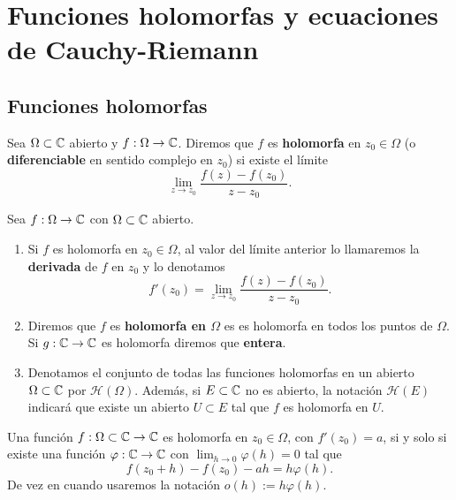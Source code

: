 \chapter{Funciones holomorfas y ecuaciones de Cauchy-Riemann}
\section{Funciones holomorfas}
\begin{definition}
Sea $\displaystyle \Omega \subset \mathbb{C} $ abierto y $\displaystyle f : \Omega \to \mathbb{C} $. Diremos que $\displaystyle f $ es \textbf{holomorfa} en $\displaystyle z_{0} \in \Omega  $ (o \textbf{diferenciable} en sentido complejo en $\displaystyle z_{0} $) si existe el límite
\[\lim_{z \to z_{0}}\frac{f\left(z\right)-f\left(z_{0}\right)}{z-z_{0}} .\]
\end{definition}
\begin{notation}
Sea $\displaystyle f : \Omega \to \mathbb{C} $ con $\displaystyle \Omega \subset \mathbb{C} $ abierto. 
\begin{enumerate}
\item Si $\displaystyle f $ es holomorfa en $\displaystyle z_{0} \in \Omega  $, al valor del límite anterior lo llamaremos la \textbf{derivada} de $\displaystyle f $ en $\displaystyle z_{0} $ y lo denotamos
	\[f'\left(z_{0}\right)=\lim_{z \to z_{0}}\frac{f\left(z\right)-f\left(z_{0}\right)}{z-z_{0}} .\]
\item Diremos que $\displaystyle f $ es \textbf{holomorfa en $\displaystyle \Omega  $} es es holomorfa en todos los puntos de $\displaystyle \Omega  $. Si $\displaystyle g : \mathbb{C} \to \mathbb{C} $ es holomorfa diremos que \textbf{entera}. 
\item Denotamos el conjunto de todas las funciones holomorfas en un abierto $\displaystyle \Omega \subset \mathbb{C}  $ por $\displaystyle \mathcal{H}\left(\Omega \right) $. Además, si $\displaystyle E \subset \mathbb{C} $ no es abierto, la notación $\displaystyle \mathcal{H}\left(E\right) $ indicará que existe un abierto $\displaystyle U \subset E $ tal que $\displaystyle f $ es holomorfa en $\displaystyle U $. 
\end{enumerate}
\end{notation}
\begin{observation}
Una función $\displaystyle f : \Omega \subset \mathbb{C} \to \mathbb{C} $ es holomorfa en $\displaystyle z_{0} \in \Omega  $, con $\displaystyle f'\left(z_{0}\right)=a $, si y solo si existe una función $\displaystyle \varphi : \mathbb{C} \to \mathbb{C} $ con $\displaystyle \lim_{h \to 0}\varphi\left(h\right)=0 $ tal que 
\[f\left(z_{0} + h\right)-f\left(z_{0}\right)-ah = h\varphi\left(h\right) .\]
De vez en cuando usaremos la notación $\displaystyle o\left(h\right):= h\varphi\left(h\right) $. 
\end{observation}
